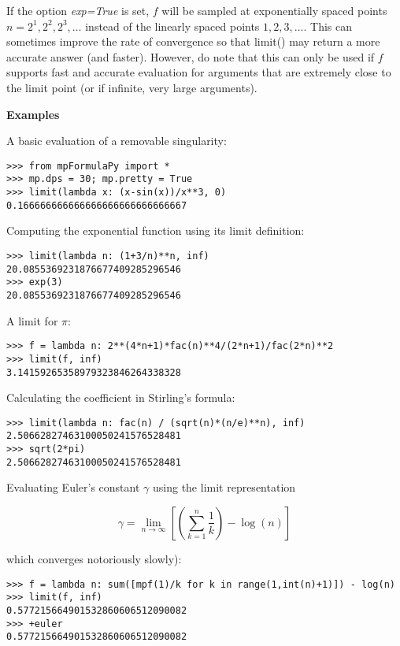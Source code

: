If the option \textit{exp=True} is set, $f$ will be sampled at exponentially spaced points $n=2^1,2^2,2^3,\ldots$ instead of the linearly spaced points $1,2,3,\ldots$. This can sometimes improve the rate of convergence so that limit() may return a more
accurate answer (and faster). However, do note that this can only be used if $f$ supports fast and accurate evaluation for arguments that are extremely close to the limit point (or if infinite, very large arguments).

\vpara
\textbf{Examples}

A basic evaluation of a removable singularity:

\begin{lstlisting}
>>> from mpFormulaPy import *
>>> mp.dps = 30; mp.pretty = True
>>> limit(lambda x: (x-sin(x))/x**3, 0)
0.166666666666666666666666666667
\end{lstlisting}

Computing the exponential function using its limit definition:

\begin{lstlisting}
>>> limit(lambda n: (1+3/n)**n, inf)
20.0855369231876677409285296546
>>> exp(3)
20.0855369231876677409285296546
\end{lstlisting}

A limit for $\pi$:

\begin{lstlisting}
>>> f = lambda n: 2**(4*n+1)*fac(n)**4/(2*n+1)/fac(2*n)**2
>>> limit(f, inf)
3.14159265358979323846264338328
\end{lstlisting}

Calculating the coefficient in Stirling's formula:

\begin{lstlisting}
>>> limit(lambda n: fac(n) / (sqrt(n)*(n/e)**n), inf)
2.50662827463100050241576528481
>>> sqrt(2*pi)
2.50662827463100050241576528481
\end{lstlisting}

Evaluating Euler's constant $\gamma$ using the limit representation

\begin{equation}
\gamma = \lim\limits_{n \rightarrow \infty}{\left[\left(\sum_{k=1}^n \frac{1}{k} \right) -\log(n)  \right]}
\end{equation}

which converges notoriously slowly):

\begin{lstlisting}
>>> f = lambda n: sum([mpf(1)/k for k in range(1,int(n)+1)]) - log(n)
>>> limit(f, inf)
0.577215664901532860606512090082
>>> +euler
0.577215664901532860606512090082
\end{lstlisting}

